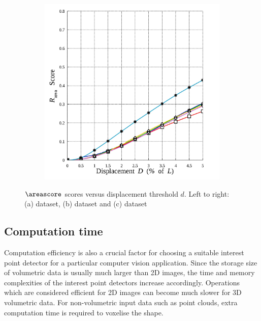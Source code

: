 \begin{figure}[ht]
\begin{subfigure}[t]{0.49\linewidth}
		\label{fig/eval/graph_mri}
	\end{subfigure}
	\begin{subfigure}[t]{0.49\linewidth}
		\centering 
		\includegraphics[width=0.95\linewidth]{./fig/eval/graph_stereo.jpg}
		\label{fig/eval/graph_mvs}
	\end{subfigure}
\caption{$\areascore$ scores versus displacement threshold $d$. Left to right: (a) \meshset dataset, (b) \mriset dataset and (c) \stereoset dataset}
\label{fig/eval/graph2}
\end{figure}

\subsection{Computation time}

Computation efficiency is also a crucial factor for choosing a suitable interest point detector for a particular computer vision application. Since the storage size of volumetric data is usually much larger than 2D images, the time and memory complexities of the interest point detectors increase accordingly. Operations which are considered efficient for 2D images can become much slower for 3D volumetric data. For non-volumetric input data such as point clouds, extra computation time is required to voxelise the shape. 


